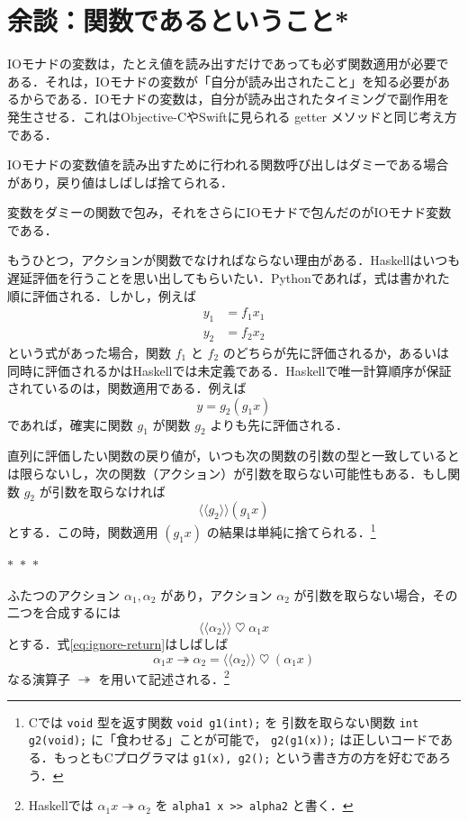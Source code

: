 \documentclass[a4paper,twocolumn]{jsbook}
\newcommand{\Langle}{\langle\!\langle}
\newcommand{\Rangle}{\rangle\!\rangle}
\newcommand{\separator}{\begin{center}$*$~$*$~$*$\end{center}}
\newcommand{\programminglanguage}[1]{\textsf{#1}}
\newcommand{\clang}{\programminglanguage{C}}
\newcommand{\haskell}{\programminglanguage{Haskell}}
\newcommand{\objectivec}{\programminglanguage{Objective-C}}
\newcommand{\python}{\programminglanguage{Python}}
\newcommand{\swift}{\programminglanguage{Swift}}
\newcommand{\code}[1]{\texttt{#1}}
\DeclareMathOperator{\mBind}{\heartsuit}
\DeclareMathOperator{\mBindRightIgnore}{\twoheadrightarrow}
\newcommand{\mFuncWith}[1]{\Langle#1\Rangle}
\begin{document}
\section{余談：関数であるということ*}

IOモナドの変数は，たとえ値を読み出すだけであっても必ず関数適用が必要である．それは，IOモナドの変数が「自分が読み出されたこと」を知る必要があるからである．IOモナドの変数は，自分が読み出されたタイミングで副作用を発生させる．これは\objectivec や\swift に見られる getter メソッドと同じ考え方である．

IOモナドの変数値を読み出すために行われる関数呼び出しはダミーである場合があり，戻り値はしばしば捨てられる．

変数をダミーの関数で包み，それをさらにIOモナドで包んだのがIOモナド変数である．

もうひとつ，アクションが関数でなければならない理由がある．\haskell はいつも遅延評価を行うことを思い出してもらいたい．\python であれば，式は書かれた順に評価される．しかし，例えば
\begin{align}
y_1&=f_1x_1\\
y_2&=f_2x_2
\end{align}
という式があった場合，関数 $f_1$ と $f_2$ のどちらが先に評価されるか，あるいは同時に評価されるかは\haskell では未定義である．\haskell で唯一計算順序が保証されているのは，関数適用である．例えば
\begin{equation}
y=g_2(g_1x)
\end{equation}
であれば，確実に関数 $g_1$ が関数 $g_2$ よりも先に評価される．

直列に評価したい関数の戻り値が，いつも次の関数の引数の型と一致しているとは限らないし，次の関数（アクション）が引数を取らない可能性もある．もし関数 $g_2$ が引数を取らなければ
\begin{equation}
\mFuncWith{g_2}(g_1x)
\end{equation}
とする．この時，関数適用 $(g_1x)$ の結果は単純に捨てられる．\footnote{\clang では \code{void} 型を返す関数 \code{void g1(int);} を 引数を取らない関数 \code{int g2(void);} に「食わせる」ことが可能で， \code{g2(g1(x));} は正しいコードである．もっとも\clang プログラマは \code{g1(x), g2();} という書き方の方を好むであろう．}

\separator

ふたつのアクション $\alpha_1,\alpha_2$ があり，アクション $\alpha_2$ が引数を取らない場合，その二つを合成するには
\begin{equation}
\label{eq:ignore-return}
\mFuncWith{\alpha_2}\mBind\alpha_1 x
\end{equation}
とする．式\eqref{eq:ignore-return}はしばしば
\begin{equation}
\alpha_1 x\mBindRightIgnore\alpha_2=\mFuncWith{\alpha_2}\mBind(\alpha_1x)
\end{equation}
なる演算子 $\mBindRightIgnore$ を用いて記述される．\footnote{\haskell では $\alpha_1x\mBindRightIgnore\alpha_2$ を \code{alpha1 x >> alpha2} と書く．}
\end{document}
